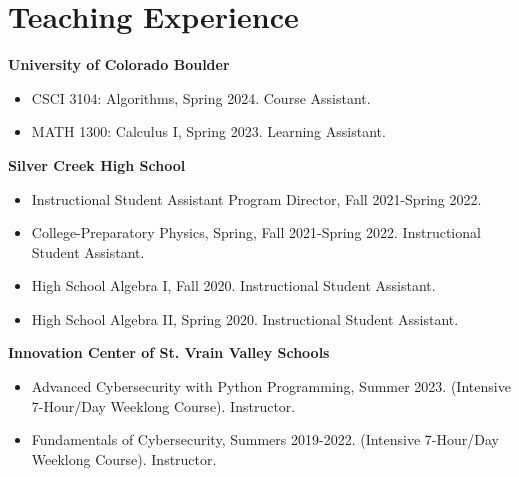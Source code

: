 \documentclass[a4paper,20pt]{article}
\begin{document}
    \section{Teaching Experience}
      \textbf{University of Colorado Boulder}
      \begin{itemize}
        \vspace{-5pt}
        \item CSCI 3104: Algorithms, Spring 2024. Course Assistant.
        \vspace{-5pt}
        \item MATH 1300: Calculus I, Spring 2023. Learning Assistant.
        \vspace{-5pt}
      \end{itemize}
      \textbf{Silver Creek High School}
      \begin{itemize}
          \vspace{-5pt}
          \item Instructional Student Assistant Program Director, Fall 2021-Spring 2022.
          \vspace{-5pt}
          \item College-Preparatory Physics, Spring, Fall 2021-Spring 2022. Instructional Student Assistant. 
          \vspace{-5pt}
          \item High School Algebra I, Fall 2020. Instructional Student Assistant. 
          \vspace{-5pt}
          \item High School Algebra II, Spring 2020. Instructional Student Assistant.
          \vspace{-5pt}
        \end{itemize}
        \textbf{Innovation Center of St. Vrain Valley Schools}
        \begin{itemize}
          \vspace{-5pt}
          \item Advanced Cybersecurity with Python Programming, Summer 2023. (Intensive 7-Hour/Day Weeklong Course). Instructor.
          \vspace{-5pt}
          \item Fundamentals of Cybersecurity, Summers 2019-2022. (Intensive 7-Hour/Day Weeklong Course). Instructor.
        \end{itemize}
      
\end{document}
